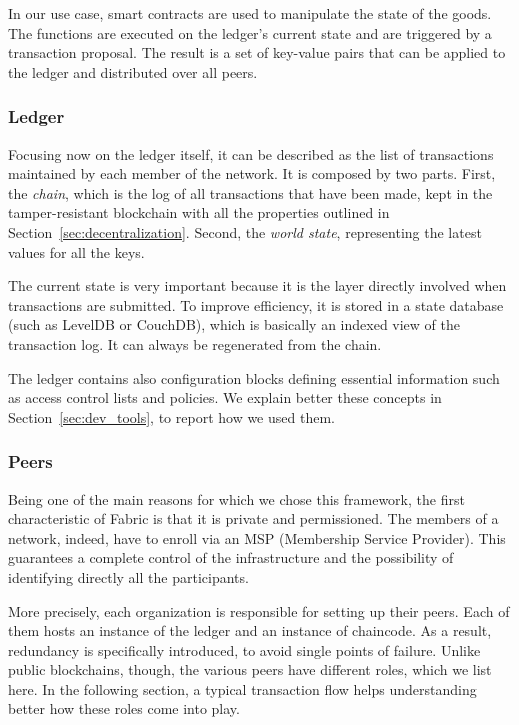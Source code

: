 In our use case, smart contracts are used to manipulate the state of the goods. The functions are executed on the ledger’s current state and are triggered by a transaction proposal. The result is a set of key-value pairs that can be applied to the ledger and distributed over all peers.

\subsubsection{Ledger}
Focusing now on the ledger itself, it can be described as the list of transactions maintained by each member of the network. It is composed by two parts. First, the \emph{chain}, which is the log of all transactions that have been made, kept in the tamper-resistant blockchain with all the properties outlined in Section~\ref{sec:decentralization}. Second, the \emph{world state}, representing the latest values for all the keys. 

The current state is very important because it is the layer directly involved when transactions are submitted. To improve efficiency, it is stored in a state database (such as LevelDB or CouchDB), which is basically an indexed view of the transaction log. It can always be regenerated from the chain.

The ledger contains also configuration blocks defining essential information such as access control lists and policies. We explain better these concepts in Section~\ref{sec:dev_tools}, to report how we used them.

\subsubsection{Peers}
Being one of the main reasons for which we chose this framework, the first characteristic of Fabric is that it is private and permissioned. The members of a network, indeed, have to enroll via an MSP (Membership Service Provider). This guarantees a complete control of the infrastructure and the possibility of identifying directly all the participants.

More precisely, each organization is responsible for setting up their peers. Each of them hosts an instance of the ledger and an instance of chaincode. As a result, redundancy is specifically introduced, to avoid single points of failure. Unlike public blockchains, though, the various peers have different roles, which we list here. In the following section, a typical transaction flow helps understanding better how these roles come into play.

